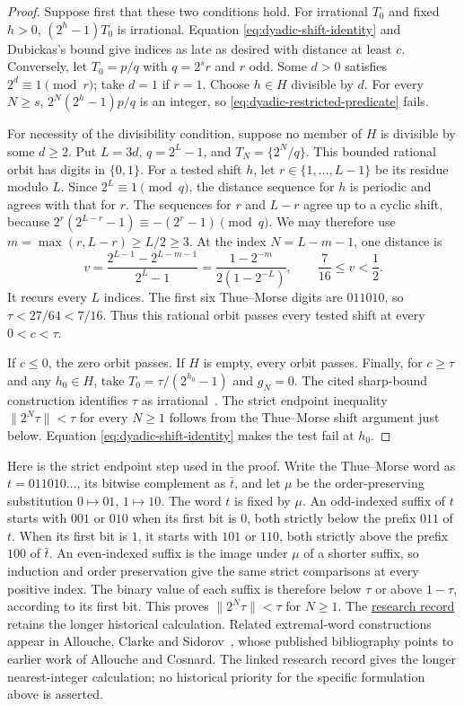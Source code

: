 \documentclass[11pt]{article}
\begin{document}
\begin{proof}
Suppose first that these two conditions hold. For irrational $T_0$ and
fixed $h>0$, $(2^h-1)T_0$ is irrational. Equation
\eqref{eq:dyadic-shift-identity} and Dubickas's bound give indices as late
as desired with distance at least $c$. Conversely, let $T_0=p/q$ with
$q=2^sr$ and $r$ odd. Some $d>0$ satisfies $2^d\equiv1\pmod r$; take
$d=1$ if $r=1$. Choose $h\in H$ divisible by $d$. For every $N\ge s$,
$2^N(2^h-1)p/q$ is an integer, so \eqref{eq:dyadic-restricted-predicate}
fails.

For necessity of the divisibility condition, suppose no member of $H$ is
divisible by some $d\ge2$. Put $L=3d$, $q=2^L-1$, and
$T_N=\{2^N/q\}$. This bounded rational orbit has digits in $\{0,1\}$.
For a tested shift $h$, let $r\in\{1,\ldots,L-1\}$ be its residue modulo
$L$. Since $2^L\equiv1\pmod q$, the distance sequence for $h$ is periodic
and agrees with that for $r$. The sequences for $r$ and $L-r$ agree up to
a cyclic shift, because
$2^r(2^{L-r}-1)\equiv-(2^r-1)\pmod q$. We may therefore use
$m=\max(r,L-r)\ge L/2\ge3$. At the index $N=L-m-1$, one distance is
\[
 v=\frac{2^{L-1}-2^{L-m-1}}{2^L-1}
   =\frac{1-2^{-m}}{2(1-2^{-L})},
 \qquad \frac7{16}\le v<\frac12.
\]
It recurs every $L$ indices. The first six Thue--Morse digits are
$011010$, so $\tau<27/64<7/16$. Thus this rational orbit passes every
tested shift at every $0<c<\tau$.

If $c\le0$, the zero orbit passes. If $H$ is empty, every orbit passes.
Finally, for $c\ge\tau$ and any $h_0\in H$, take
$T_0=\tau/(2^{h_0}-1)$ and $g_N=0$. The cited sharp-bound construction
identifies $\tau$ as irrational~\cite{akiyamakaneko}. The strict endpoint
inequality $\|2^N\tau\|<\tau$ for every $N\ge1$ follows from the
Thue--Morse shift argument just below. Equation
\eqref{eq:dyadic-shift-identity} makes the test fail at $h_0$.
\end{proof}

Here is the strict endpoint step used in the proof. Write the Thue--Morse
word as $t=011010\ldots$, its bitwise complement as $\bar t$, and let
$\mu$ be the order-preserving substitution $0\mapsto01$, $1\mapsto10$.
The word $t$ is fixed by $\mu$. An odd-indexed suffix of $t$ starts with
$001$ or $010$ when its first bit is $0$, both strictly below the prefix
$011$ of $t$. When its first bit is $1$, it starts with $101$ or $110$,
both strictly above the prefix $100$ of $\bar t$. An even-indexed suffix
is the image under $\mu$ of a shorter suffix, so induction and order
preservation give the same strict comparisons at every positive index.
The binary value of each suffix is therefore below $\tau$ or above
$1-\tau$, according to its first bit. This proves
$\|2^N\tau\|<\tau$ for $N\ge1$. The
\href{\repobase/research/experiments/premise_exchange/README.md\#how-the-question-closed}{research record}
retains the longer historical calculation. Related
extremal-word constructions appear in Allouche, Clarke and
Sidorov~\cite{alloucheclarkesidorov}, whose published bibliography points to
earlier work of Allouche and Cosnard. The linked research record gives the
longer nearest-integer calculation; no historical priority for the
specific formulation above is asserted.
\end{document}
